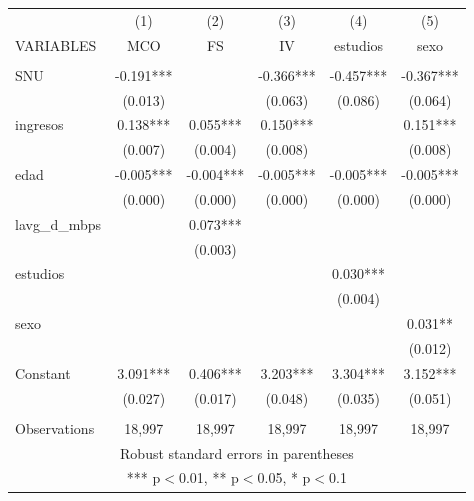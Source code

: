 \begin{tabular}{lccccc} \hline
 & (1) & (2) & (3) & (4) & (5) \\
VARIABLES & MCO & FS & IV & estudios & sexo \\ \hline
 &  &  &  &  &  \\
SNU & -0.191*** &  & -0.366*** & -0.457*** & -0.367*** \\
 & (0.013) &  & (0.063) & (0.086) & (0.064) \\
ingresos & 0.138*** & 0.055*** & 0.150*** &  & 0.151*** \\
 & (0.007) & (0.004) & (0.008) &  & (0.008) \\
edad & -0.005*** & -0.004*** & -0.005*** & -0.005*** & -0.005*** \\
 & (0.000) & (0.000) & (0.000) & (0.000) & (0.000) \\
lavg\_d\_mbps &  & 0.073*** &  &  &  \\
 &  & (0.003) &  &  &  \\
estudios &  &  &  & 0.030*** &  \\
 &  &  &  & (0.004) &  \\
sexo &  &  &  &  & 0.031** \\
 &  &  &  &  & (0.012) \\
Constant & 3.091*** & 0.406*** & 3.203*** & 3.304*** & 3.152*** \\
 & (0.027) & (0.017) & (0.048) & (0.035) & (0.051) \\
 &  &  &  &  &  \\
 Observations & 18,997 & 18,997 & 18,997 & 18,997 & 18,997 \\ \hline
\multicolumn{6}{c}{ Robust standard errors in parentheses} \\
\multicolumn{6}{c}{ *** p$<$0.01, ** p$<$0.05, * p$<$0.1} \\
\end{tabular}
